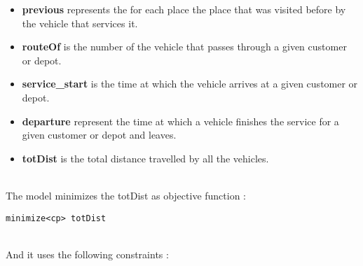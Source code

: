 \documentclass{eplDoc}
\begin{document}
\begin{itemize}
	\item \textbf{previous} represents the for each place the place that was visited before by the vehicle that services it. 
	\item \textbf{routeOf} is the number of the vehicle that passes through a given customer or depot.
	\item \textbf{service\_start} is the time at which the vehicle arrives at a given customer or depot.
	\item \textbf{departure} represent the time at which a vehicle finishes the service for a given customer or depot and leaves.
	\item \textbf{totDist} is the total distance travelled by all the vehicles.
\end{itemize}
 \ \\ 
The model minimizes the totDist as objective function : 
\begin{lstlisting}
minimize<cp> totDist
\end{lstlisting}
 \ \\ 
And it uses the following constraints : 
\end{document}
